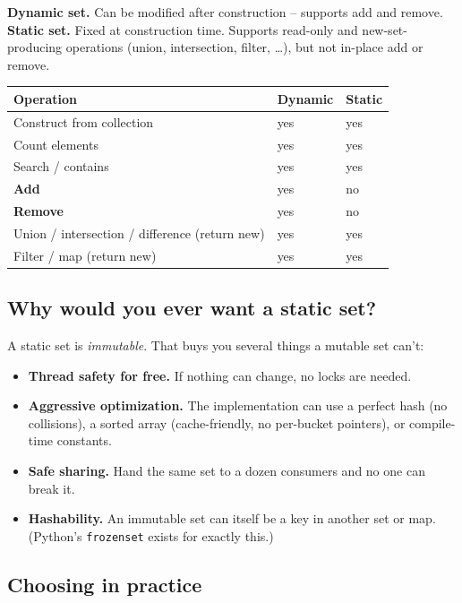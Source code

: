 \documentclass[11pt]{article}
\begin{document}
\begin{defnbox}
\textbf{Dynamic set.} Can be modified after construction -- supports add and remove.
\textbf{Static set.} Fixed at construction time. Supports read-only and new-set-producing operations (union, intersection, filter, \ldots), but not in-place add or remove.
\end{defnbox}

\begin{center}
\begin{tabular}{lll}
\hline
Operation & Dynamic & Static \\
\hline
Construct from collection & yes & yes \\
Count elements & yes & yes \\
Search / contains & yes & yes \\
\textbf{Add} & yes & no \\
\textbf{Remove} & yes & no \\
Union / intersection / difference (return new) & yes & yes \\
Filter / map (return new) & yes & yes \\
\hline
\end{tabular}
\end{center}

\subsection*{Why would you ever want a static set?}

\begin{ideabox}
A static set is \emph{immutable}. That buys you several things a mutable set can't:
\begin{itemize}[leftmargin=*]
    \item \textbf{Thread safety for free.} If nothing can change, no locks are needed.
    \item \textbf{Aggressive optimization.} The implementation can use a perfect hash (no collisions), a sorted array (cache-friendly, no per-bucket pointers), or compile-time constants.
    \item \textbf{Safe sharing.} Hand the same set to a dozen consumers and no one can break it.
    \item \textbf{Hashability.} An immutable set can itself be a key in another set or map. (Python's \texttt{frozenset} exists for exactly this.)
\end{itemize}
\end{ideabox}

\subsection*{Choosing in practice}
\end{document}
